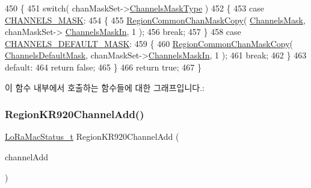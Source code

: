 \begin{DoxyCode}
450 \{
451     \textcolor{keywordflow}{switch}( chanMaskSet->\mbox{\hyperlink{structs_chan_mask_set_params_a02b75be74cbc34fa2126b2c250ea9283}{ChannelsMaskType}} )
452     \{
453         \textcolor{keywordflow}{case} \mbox{\hyperlink{group___r_e_g_i_o_n_gga7a62e669f567fc160ad58210664bca9ca1e68275c0b16a0c4935eada4315dd089}{CHANNELS\_MASK}}:
454         \{
455             \mbox{\hyperlink{group___r_e_g_i_o_n_c_o_m_m_o_n_ga95f5199d490113269fae7f2e0569e9a0}{RegionCommonChanMaskCopy}}( \mbox{\hyperlink{_region_k_r920_8c_a2188957b5ca6af8092154d7ccbfa5757}{ChannelsMask}}, chanMaskSet->
      \mbox{\hyperlink{structs_chan_mask_set_params_ade387d6ecaf27781b14ad97ebdfc0695}{ChannelsMaskIn}}, 1 );
456             \textcolor{keywordflow}{break};
457         \}
458         \textcolor{keywordflow}{case} \mbox{\hyperlink{group___r_e_g_i_o_n_gga7a62e669f567fc160ad58210664bca9ca9bbb18c8600ad8781ba04a2cb121ea60}{CHANNELS\_DEFAULT\_MASK}}:
459         \{
460             \mbox{\hyperlink{group___r_e_g_i_o_n_c_o_m_m_o_n_ga95f5199d490113269fae7f2e0569e9a0}{RegionCommonChanMaskCopy}}( 
      \mbox{\hyperlink{_region_k_r920_8c_ac127b19779301713d5ed92eb03366a2d}{ChannelsDefaultMask}}, chanMaskSet->\mbox{\hyperlink{structs_chan_mask_set_params_ade387d6ecaf27781b14ad97ebdfc0695}{ChannelsMaskIn}}, 1 );
461             \textcolor{keywordflow}{break};
462         \}
463         \textcolor{keywordflow}{default}:
464             \textcolor{keywordflow}{return} \textcolor{keyword}{false};
465     \}
466     \textcolor{keywordflow}{return} \textcolor{keyword}{true};
467 \}
\end{DoxyCode}
이 함수 내부에서 호출하는 함수들에 대한 그래프입니다.\+:
\mbox{\label{group___r_e_g_i_o_n_k_r920_gaca1aceccde474cc473e09dc3113ec876}} 
\subsubsection{\texorpdfstring{Region\+K\+R920\+Channel\+Add()}{RegionKR920ChannelAdd()}}
{\footnotesize\ttfamily \mbox{\hyperlink{group___l_o_r_a_m_a_c_ga30bd25657e10480f8605ee951b0ecfbd}{Lo\+Ra\+Mac\+Status\+\_\+t}} Region\+K\+R920\+Channel\+Add (\begin{DoxyParamCaption}\item[{\mbox{\hyperlink{group___r_e_g_i_o_n_gab1c5f3aa06614283202906cef4417860}{Channel\+Add\+Params\+\_\+t}} $\ast$}]{channel\+Add }\end{DoxyParamCaption})}



